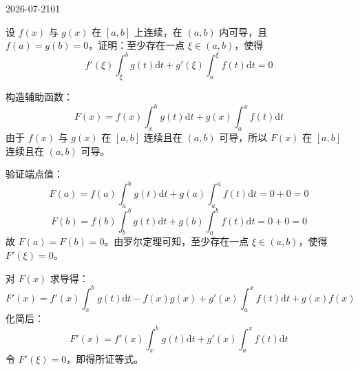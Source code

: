 \begin{mistake}{2026-07-21}{01}

\begin{problemcontent}
设 \(f(x)\) 与 \(g(x)\) 在 \([a, b]\) 上连续，在 \((a, b)\) 内可导，且 \(f(a) = g(b) = 0\)，证明：至少存在一点 \(\xi \in (a, b)\)，使得
\[ f'(\xi) \int_{\xi}^b g(t) \mathrm{d}t + g'(\xi) \int_a^{\xi} f(t) \mathrm{d}t = 0 \]
\end{problemcontent}

\begin{solutioncontent}
构造辅助函数：
\[ F(x) = f(x) \int_x^b g(t) \mathrm{d}t + g(x) \int_a^x f(t) \mathrm{d}t \]
由于 \(f(x)\) 与 \(g(x)\) 在 \([a, b]\) 连续且在 \((a, b)\) 可导，所以 \(F(x)\) 在 \([a, b]\) 连续且在 \((a, b)\) 可导。

验证端点值：
\[ F(a) = f(a) \int_a^b g(t) \mathrm{d}t + g(a) \int_a^a f(t) \mathrm{d}t = 0 + 0 = 0 \]
\[ F(b) = f(b) \int_b^b g(t) \mathrm{d}t + g(b) \int_a^b f(t) \mathrm{d}t = 0 + 0 = 0 \]
故 \(F(a) = F(b) = 0\)。由罗尔定理可知，至少存在一点 \(\xi \in (a,b)\)，使得 \(F'(\xi) = 0\)。

对 \(F(x)\) 求导得：
\[ F'(x) = f'(x) \int_x^b g(t)\mathrm{d}t - f(x)g(x) + g'(x) \int_a^x f(t)\mathrm{d}t + g(x)f(x) \]
化简后：
\[ F'(x) = f'(x) \int_x^b g(t)\mathrm{d}t + g'(x) \int_a^x f(t)\mathrm{d}t \]
令 \(F'(\xi) = 0\)，即得所证等式。
\end{solutioncontent}


\end{mistake}
